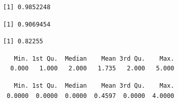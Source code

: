 \documentclass[
  letterpaper,
  DIV=11,
  numbers=noendperiod]{scrartcl}
\newenvironment{Shaded}{\begin{snugshade}}{\end{snugshade}}
\newcommand{\CommentTok}[1]{\textcolor[rgb]{0.37,0.37,0.37}{#1}}
\newcommand{\FunctionTok}[1]{\textcolor[rgb]{0.28,0.35,0.67}{#1}}
\newcommand{\NormalTok}[1]{\textcolor[rgb]{0.00,0.23,0.31}{#1}}
\newcommand{\SpecialCharTok}[1]{\textcolor[rgb]{0.37,0.37,0.37}{#1}}
\begin{document}
\begin{verbatim}
[1] 0.9852248
\end{verbatim}

\begin{Shaded}
\end{Shaded}

\begin{verbatim}
[1] 0.9069454
\end{verbatim}

\begin{Shaded}
\end{Shaded}

\begin{verbatim}
[1] 0.82255
\end{verbatim}

\begin{Shaded}
\end{Shaded}

\begin{verbatim}
   Min. 1st Qu.  Median    Mean 3rd Qu.    Max. 
  0.000   1.000   2.000   1.735   2.000   5.000 
\end{verbatim}

\begin{Shaded}
\end{Shaded}

\begin{verbatim}
   Min. 1st Qu.  Median    Mean 3rd Qu.    Max. 
 0.0000  0.0000  0.0000  0.4597  0.0000  4.0000 
\end{verbatim}

\begin{Shaded}
\end{Shaded}
\end{document}
